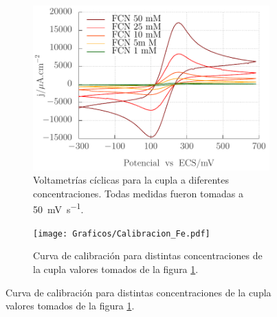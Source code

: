 			\begin{figure}[ht]
	 	    	\begin{subfigure}[t]{0.5\textwidth}
	         	\includegraphics[width=\textwidth]{Graficos/Concentraciones_Fe.pdf}
	        	\caption{Voltametrías cíclicas para la cupla \fe\space a diferentes concentraciones. Todas medidas fueron tomadas a \SI{50}{\milli\volt\per\second}.}
	         	\label{fig:Fe_a}
	     		\end{subfigure}
     		 \begin{subfigure}[t]{0.495\textwidth}
	        	\texttt{[image: Graficos/Calibracion\_Fe.pdf]}
	       		\caption{Curva de calibración para distintas concentraciones de la cupla \fe\space valores tomados de la figura \ref{fig:Fe_a}.}
	         	\label{fig:Fe_b}
	     		\end{subfigure}


\end{figure}

